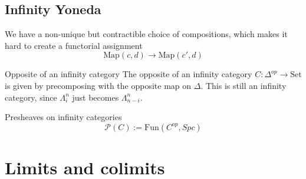 \subsection{Infinity Yoneda}

We have a non-unique but contractible choice of compositions, which makes it hard to create a functorial assignment $$\mathrm{Map}(c,d)\rightarrow \mathrm{Map}(c',d)$$

\begin{definition}{Opposite of an infinity category}{}
    The opposite of an infinity category $C:\Delta^{op}\rightarrow \mathrm{Set}$ is given by precomposing with the opposite map on $\Delta$. This is still an infinity category, since $\Lambda^n_i$ just becomes $\Lambda^n_{n-i}$.  
\end{definition}


Presheaves on infinity categories
$$\mathcal{P}(C):=\mathrm{Fun}(C^{op}, Spc)$$

\section{Limits and colimits}

